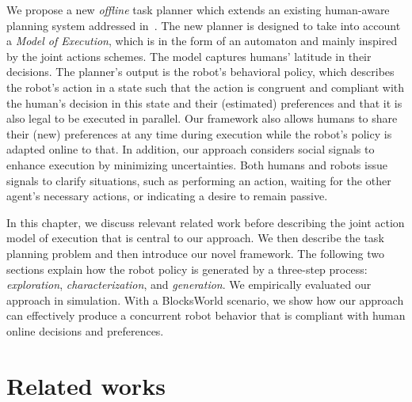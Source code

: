We propose a new \textit{offline} task planner which extends an existing human-aware planning system addressed in~\cite{buisan_hatpehda_icra}. 
The new planner is designed to take into account a \textit{Model of Execution}, which is in the form of an automaton and mainly inspired by the joint actions schemes. 
The model captures humans' latitude in their decisions. 
The planner's output is the robot's behavioral policy, which describes the robot's action in a state such that the action is congruent and compliant with the human's decision in this state and their (estimated) preferences and that it is also legal to be executed in parallel. 
Our framework also allows humans to share their (new) preferences at any time during execution while the robot's policy is adapted online to that. 
In addition, our approach considers social signals to enhance execution by minimizing uncertainties. Both humans and robots issue signals to clarify situations, such as performing an action, waiting for the other agent's necessary actions, or indicating a desire to remain passive.

In this chapter, we discuss relevant related work before describing the joint action model of execution that is central to our approach. 
We then describe the task planning problem and then introduce our novel framework. 
The following two sections explain how the robot policy is generated by a three-step process: \textit{exploration}, \textit{characterization}, and \textit{generation}. 
We empirically evaluated our approach in simulation. With a BlocksWorld scenario, we show how our approach can effectively produce a concurrent robot behavior that is compliant with human online decisions and preferences.  

\section{Related works}

